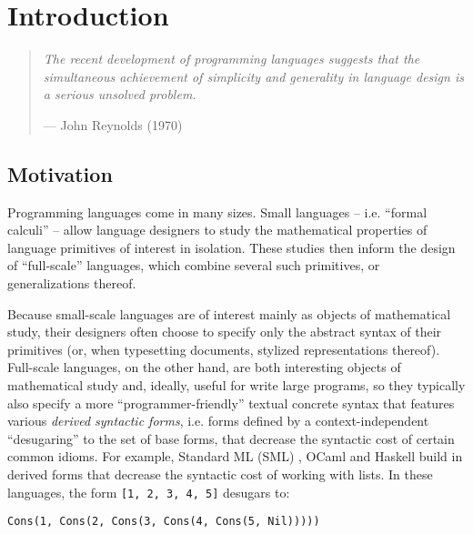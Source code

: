 \chapter{Introduction}\label{chap:intro}
\begin{quote}\textit{The recent development of programming languages suggests that the simul\-taneous achievement of simplicity 
and generality in language design is a serious unsolved 
problem.}\begin{flushright}--- John Reynolds (1970) \cite{Reynolds70}\end{flushright}
\end{quote}
\section{Motivation}\label{sec:intro-motivation}


Programming languages come in many sizes. Small languages -- i.e. ``formal {calculi}'' -- allow language designers to  study the mathematical properties of language primitives of interest in isolation. These studies then inform the design of ``full-scale'' 
 languages, which combine several such primitives, or generalizations thereof.

Because small-scale languages are of interest mainly as objects of mathematical study, their designers often choose to specify only the abstract syntax of their primitives (or, when typesetting documents, stylized representations thereof). Full-scale languages, on the other hand, are both interesting objects of mathematical study and, ideally, useful for write large programs, so they  typically also specify a more ``programmer-friendly'' textual concrete syntax that features various \emph{derived syntactic forms}, i.e. forms defined by a context-independent ``desugaring'' to the set of base forms, that decrease the syntactic cost of certain common idioms. 
For example, Standard ML (SML) \cite{mthm97-for-dart,harper1997programming}, OCaml \cite{ocaml-manual} and Haskell \cite{jones2003haskell}   build in 
derived forms that decrease the syntactic cost of working with lists. In these languages, the form \lstinline{[1, 2, 3, 4, 5]} desugars to: 
\begin{lstlisting}[numbers=none]
Cons(1, Cons(2, Cons(3, Cons(4, Cons(5, Nil)))))
\end{lstlisting}

